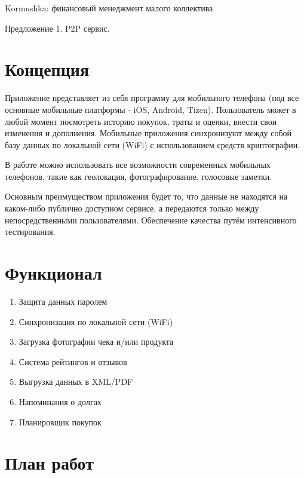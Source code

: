 \documentclass[a4paper,12pt]{article} %
\begin{document}
\thispagestyle{empty}%

\begin{flushright}

Kormushka: финансовый менеджмент малого коллектива

Предложение 1. P2P сервис.

\hrulefill
\end{flushright}

\section*{Концепция}

Приложение представляет из себя программу для мобильного телефона (под все основные мобильные платформы - iOS, Android, Tizen). Пользователь может в любой момент посмотреть историю покупок, траты и оценки, внести свои изменения и дополнения. Мобильные приложения синхронизуют между собой базу данных по локальной сети (WiFi) с использованием средств криптографии.


В работе можно использовать все возможности современных мобильных телефонов, такие как геолокация, фотографирование, голосовые заметки.


Основным преимуществом приложения будет то, что данные не находятся на каком-либо публично доступном сервисе, а передаются только между непосредственными пользователями. Обеспечение качества путём интенсивного тестирования.

\section*{Функционал}

\begin{enumerate}

\item Защита данных паролем
\item Синхронизация по локальной сети (WiFi)
\item Загрузка фотографии чека и/или продукта
\item Система рейтингов и отзывов
\item Выгрузка данных в XML/PDF
\item Напоминания о долгах
\item Планировщик покупок

\end{enumerate}

\section*{План работ}
\end{document}
